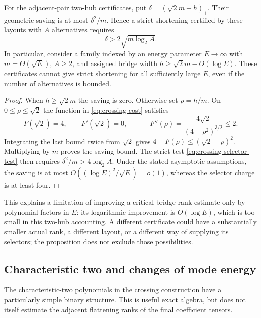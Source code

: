 \begin{proposition}\label{prop:bridge-deficit}
For the adjacent-pair two-hub certificates, put $\delta=(\sqrt2m-h)_+$. Their geometric saving is at most $\delta^2/m$. Hence a strict shortening certified by these layouts with $A$ alternatives requires
\[
 \delta>2\sqrt{m\log_2 A}.
\]
In particular, consider a family indexed by an energy parameter $E\to\infty$ with $m=\Theta(\sqrt E)$, $A\geq2$, and assigned bridge width $h\geq\sqrt2m-O(\log E)$. These certificates cannot give strict shortening for all sufficiently large $E$, even if the number of alternatives is bounded.
\end{proposition}
\begin{proof}
When $h\geq\sqrt2m$ the saving is zero. Otherwise set $\rho=h/m$. On $0\leq\rho\leq\sqrt2$ the function in \eqref{eq:crossing-cost} satisfies
\[
 F(\sqrt2)=4,\qquad F'(\sqrt2)=0,\qquad
 -F''(\rho)=\frac{4\sqrt2}{(4-\rho^2)^{3/2}}\leq2.
\]
Integrating the last bound twice from $\sqrt2$ gives
$4-F(\rho)\leq(\sqrt2-\rho)^2$. Multiplying by $m$ proves the saving bound. The strict test \eqref{eq:crossing-selector-test} then requires $\delta^2/m>4\log_2 A$. Under the stated asymptotic assumptions, the saving is at most $O((\log E)^2/\sqrt E)=o(1)$, whereas the selector charge is at least four.
\end{proof}

This explains a limitation of improving a critical bridge-rank estimate only by polynomial factors in $E$: its logarithmic improvement is $O(\log E)$, which is too small in this two-hub accounting. A different certificate could have a substantially smaller actual rank, a different layout, or a different way of supplying its selectors; the proposition does not exclude those possibilities.

\subsection{Characteristic two and changes of mode energy}
The characteristic-two polynomials in the crossing construction have a particularly simple binary structure. This is useful exact algebra, but does not itself estimate the adjacent flattening ranks of the final coefficient tensors.

